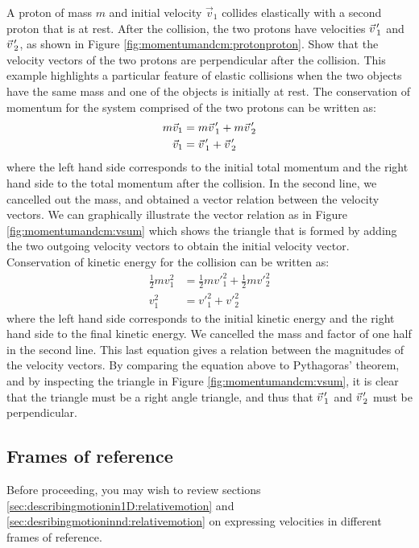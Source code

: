\begin{example}{
 A proton of mass $m$ and initial velocity $\vec v_1$ collides elastically with a second proton that is at rest. After the collision, the two protons have velocities $\pvec v'_1$ and $\pvec v'_2$, as shown in Figure \ref{fig:momentumandcm:protonproton}. Show that the velocity vectors of the two protons are perpendicular after the collision.}
This example highlights a particular feature of elastic collisions when the two objects have the same mass and one of the objects is initially at rest. The conservation of momentum for the system comprised of the two protons can be written as:
\begin{align*}
m\vec v_1 &= m\pvec v'_1 + m\pvec v'_2\\
\vec v_1 &= \pvec v'_1 + \pvec v'_2
\end{align*}
where the left hand side corresponds to the initial total momentum and the right hand side to the total momentum after the collision. In the second line, we cancelled out the mass, and obtained a vector relation between the velocity vectors. We can graphically illustrate the vector relation as in Figure \ref{fig:momentumandcm:vsum} which shows the triangle that is formed by adding the two outgoing velocity vectors to obtain the initial velocity vector.
Conservation of kinetic energy for the collision can be written as:
\begin{align*}
\frac{1}{2}mv_1^2 &= \frac{1}{2}mv'^2_1+\frac{1}{2}mv'^2_2\\
v_1^2 &= v'^2_1+ v'^2_2
\end{align*}
where the left hand side corresponds to the initial kinetic energy and the right hand side to the final kinetic energy. We cancelled the mass and factor of one half in the second line. This last equation gives a relation between the magnitudes of the velocity vectors. By comparing the equation above to Pythagoras' theorem, and by inspecting the triangle in Figure \ref{fig:momentumandcm:vsum}, it is clear that the triangle must be a right angle triangle, and thus that $\pvec v'_1$ and $\pvec v'_2$ must be perpendicular.
\end{example}

\subsection{Frames of reference}
\begin{review}
Before proceeding, you may wish to review sections \ref{sec:describingmotionin1D:relativemotion} and  \ref{sec:desribingmotioninnd:relativemotion} on expressing velocities in different frames of reference.
\end{review}


